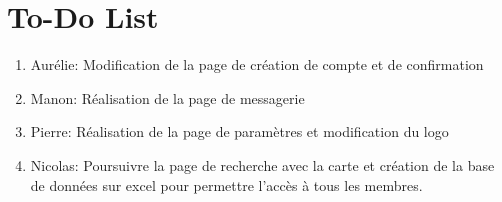 \documentclass{report}
\begin{document}
\section{To-Do List}

\begin{enumerate}
    \item Aurélie: Modification de la page de création de compte et de confirmation
    \item Manon: Réalisation de la page de messagerie
    \item Pierre: Réalisation de la page de paramètres et modification du logo
    \item Nicolas: Poursuivre la page de recherche avec la carte et création de la base de données sur excel pour permettre l'accès à tous les membres.
\end{enumerate}
\end{document}
